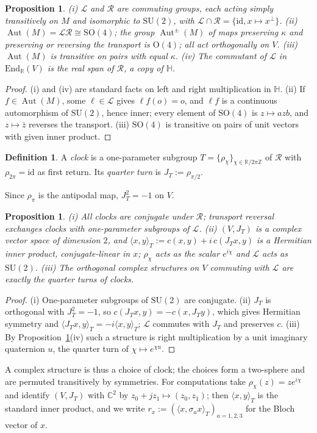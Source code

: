 \documentclass[aps,pra,onecolumn,superscriptaddress,nofootinbib,10pt]{revtex4-2}
\newtheorem{proposition}[theorem]{Proposition}
\theoremstyle{definition}
\newtheorem{definition}[theorem]{Definition}
\theoremstyle{remark}
\newcommand{\R}{\mathbb{R}}
\newcommand{\C}{\mathbb{C}}
\newcommand{\HH}{\mathbb{H}}
\newcommand{\Z}{\mathbb{Z}}
\newcommand{\cL}{\mathcal{L}}
\newcommand{\cR}{\mathcal{R}}
\newcommand{\Aut}{\operatorname{Aut}}
\newcommand{\ip}[2]{\langle #1,#2\rangle}
\newcommand{\SU}{\mathrm{SU}}
\newcommand{\SO}{\mathrm{SO}}
\newcommand{\OO}{\mathrm{O}}
\begin{document}
\begin{proposition}\label{prop:aut}
(i) $\cL$ and $\cR$ are commuting groups, each acting simply transitively on $M$ and isomorphic to
$\SU(2)$, with $\cL\cap\cR=\{\mathrm{id},x\mapsto x^\perp\}$.
(ii) $\Aut(M)=\cL\cR\cong\SO(4)$; the group $\Aut^\pm(M)$ of maps preserving $\kappa$ and preserving or
reversing the transport is $\OO(4)$; all act orthogonally on $V$.
(iii) $\Aut(M)$ is transitive on pairs with equal $\kappa$.
(iv) The commutant of $\cL$ in $\mathrm{End}_\R(V)$ is the real span of $\cR$, a copy of $\HH$.
\end{proposition}
\begin{proof}
(i) and (iv) are standard facts on left and right multiplication in $\HH$.  (ii) If $f\in\Aut(M)$,
some $\ell\in\cL$ gives $\ell f(o)=o$, and $\ell f$ is a continuous automorphism of $\SU(2)$, hence
inner; every element of $\SO(4)$ is $z\mapsto azb$, and $z\mapsto\bar z$ reverses the transport.
(iii) $\SO(4)$ is transitive on pairs of unit vectors with given inner product.
\end{proof}

\begin{definition}
A \emph{clock} is a one-parameter subgroup $T=\{\rho_\chi\}_{\chi\in\R/2\pi\Z}$ of $\cR$ with
$\rho_{2\pi}=\mathrm{id}$ as first return.  Its \emph{quarter turn} is $J_T:=\rho_{\pi/2}$.
\end{definition}
Since $\rho_\pi$ is the antipodal map, $J_T^2=-1$ on $V$.

\begin{proposition}\label{prop:clock}
(i) All clocks are conjugate under $\cR$; transport reversal exchanges clocks with one-parameter
subgroups of $\cL$.
(ii) $(V,J_T)$ is a complex vector space of dimension $2$, and
$\ip{x}{y}_T:=c(x,y)+i\,c(J_Tx,y)$
is a Hermitian inner product, conjugate-linear in $x$; $\rho_\chi$ acts as the scalar $e^{i\chi}$
and $\cL$ acts as $\SU(2)$.
(iii) The orthogonal complex structures on $V$ commuting with $\cL$ are exactly the quarter turns of clocks.
\end{proposition}
\begin{proof}
(i) One-parameter subgroups of $\SU(2)$ are conjugate.  (ii) $J_T$ is orthogonal with $J_T^2=-1$, so
$c(J_Tx,y)=-c(x,J_Ty)$, which gives Hermitian symmetry and $\ip{J_Tx}{y}_T=-i\ip{x}{y}_T$; $\cL$
commutes with $J_T$ and preserves $c$.  (iii) By Proposition~\ref{prop:aut}(iv) such a structure is
right multiplication by a unit imaginary quaternion $u$, the quarter turn of $\chi\mapsto e^{\chi u}$.
\end{proof}
A complex structure is thus a choice of clock; the choices form a two-sphere and are permuted
transitively by symmetries.  For computations take $\rho_\chi(z)=ze^{i\chi}$ and identify
$(V,J_T)$ with $\C^2$ by $z_0+jz_1\mapsto(z_0,z_1)$; then $\ip{x}{y}_T$ is the standard inner product,
and we write $r_x:=(\ip{x}{\sigma_a x}_T)_{a=1,2,3}$ for the Bloch vector of $x$.
\end{document}
